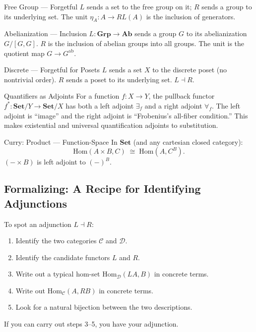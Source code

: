 \begin{example}{Free Group --- Forgetful}
$L$ sends a set to the free group on it; $R$ sends a group to its
underlying set. The unit $\eta_A : A \to R L(A)$ is the inclusion of
generators.
\end{example}

\begin{example}{Abelianization --- Inclusion}
$L : \mathbf{Grp} \to \mathbf{Ab}$ sends a group $G$ to its abelianization
$G / [G, G]$. $R$ is the inclusion of abelian groups into all groups. The
unit is the quotient map $G \to G^{\mathrm{ab}}$.
\end{example}

\begin{example}{Discrete --- Forgetful for Posets}
$L$ sends a set $X$ to the discrete poset (no nontrivial order). $R$ sends
a poset to its underlying set. $L \dashv R$.
\end{example}

\begin{example}{Quantifiers as Adjoints}
For a function $f : X \to Y$, the pullback functor $f^* : \mathbf{Set}/Y
\to \mathbf{Set}/X$ has both a left adjoint $\exists_f$ and a right
adjoint $\forall_f$. The left adjoint is ``image'' and the right adjoint
is ``Frobenius's all-fiber condition.'' This makes existential and
universal quantification adjoints to substitution.
\end{example}

\begin{example}{Curry: Product --- Function-Space}
In $\mathbf{Set}$ (and any cartesian closed category):
\begin{equation*}
  \mathrm{Hom}(A \times B, C) \;\cong\; \mathrm{Hom}(A, C^B).
\end{equation*}
$(- \times B)$ is left adjoint to $(-)^B$.
\end{example}

\subsection{Formalizing: A Recipe for Identifying Adjunctions}

To spot an adjunction $L \dashv R$:
\begin{enumerate}
  \item Identify the two categories $\mathcal{C}$ and $\mathcal{D}$.
  \item Identify the candidate functors $L$ and $R$.
  \item Write out a typical hom-set $\mathrm{Hom}_\mathcal{D}(L A, B)$
        in concrete terms.
  \item Write out $\mathrm{Hom}_\mathcal{C}(A, R B)$ in concrete terms.
  \item Look for a natural bijection between the two descriptions.
\end{enumerate}
If you can carry out steps 3--5, you have your adjunction.

